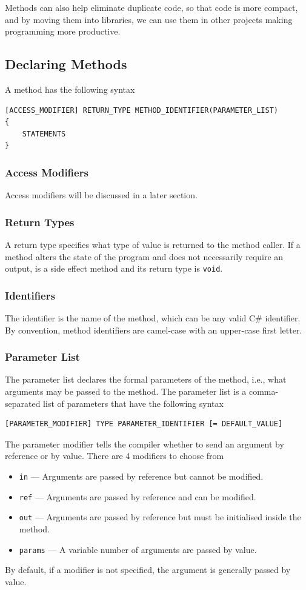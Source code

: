 \documentclass{article}
\begin{document}
Methods can also help eliminate duplicate code, so that code is more compact, and by
moving them into libraries, we can use them in other projects making programming
more productive.
\subsection{Declaring Methods}
A method has the following syntax
\begin{lstlisting}[numbers=none]
[ACCESS_MODIFIER] RETURN_TYPE METHOD_IDENTIFIER(PARAMETER_LIST)
{
    STATEMENTS
}    
\end{lstlisting}
\subsubsection{Access Modifiers}
Access modifiers will be discussed in a later section.
\subsubsection{Return Types}
A return type specifies what type of value is returned to the method caller.
If a method alters the state of the program and does not
necessarily require an output, is a side effect method and its return type is
\lstinline{void}.
\subsubsection{Identifiers}
The identifier is the name of the method, which can be any valid C\# identifier.
By convention, method identifiers are camel-case with an upper-case first letter.
\subsubsection{Parameter List}
The parameter list declares the formal parameters of the method, i.e.,
what arguments may be passed to the method. The parameter list is
a comma-separated list of parameters that have the following syntax
\begin{lstlisting}[numbers=none]
[PARAMETER_MODIFIER] TYPE PARAMETER_IDENTIFIER [= DEFAULT_VALUE]
\end{lstlisting}
The parameter modifier tells the compiler whether to send an argument by reference
or by value. There are 4 modifiers to choose from
\begin{itemize}
    \item \lstinline{in} --- Arguments are passed by reference but cannot be modified.
    \item \lstinline{ref} --- Arguments are passed by reference and can be modified.
    \item \lstinline{out} --- Arguments are passed by reference but must be initialised inside the method.
    \item \lstinline{params} --- A variable number of arguments are passed by value.
\end{itemize}
By default, if a modifier is not specified, the argument is generally passed by value.
\end{document}
